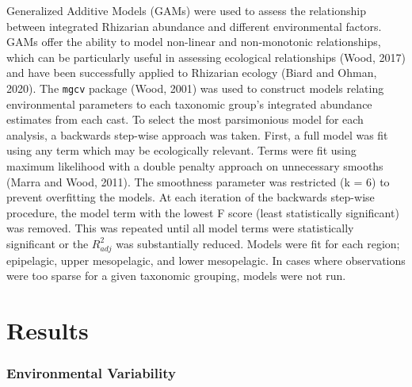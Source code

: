 \documentclass[
]{article}
\begin{document}
Generalized Additive Models (GAMs) were used to assess the relationship
between integrated Rhizarian abundance and different environmental
factors. GAMs offer the ability to model non-linear and non-monotonic
relationships, which can be particularly useful in assessing ecological
relationships (Wood, 2017) and have been successfully applied to
Rhizarian ecology (Biard and Ohman, 2020). The \texttt{mgcv} package
(Wood, 2001) was used to construct models relating environmental
parameters to each taxonomic group's integrated abundance estimates from
each cast. To select the most parsimonious model for each analysis, a
backwards step-wise approach was taken. First, a full model was fit
using any term which may be ecologically relevant. Terms were fit using
maximum likelihood with a double penalty approach on unnecessary smooths
(Marra and Wood, 2011). The smoothness parameter was restricted (k = 6)
to prevent overfitting the models. At each iteration of the backwards
step-wise procedure, the model term with the lowest F score (least
statistically significant) was removed. This was repeated until all
model terms were statistically significant or the \(R^2_{adj}\) was
substantially reduced. Models were fit for each region; epipelagic,
upper mesopelagic, and lower mesopelagic. In cases where observations
were too sparse for a given taxonomic grouping, models were not run.

\hypertarget{results}{%
\section{Results}\label{results}}

\hypertarget{environmental-variability}{%
\subsubsection{Environmental
Variability}\label{environmental-variability}}
\end{document}
